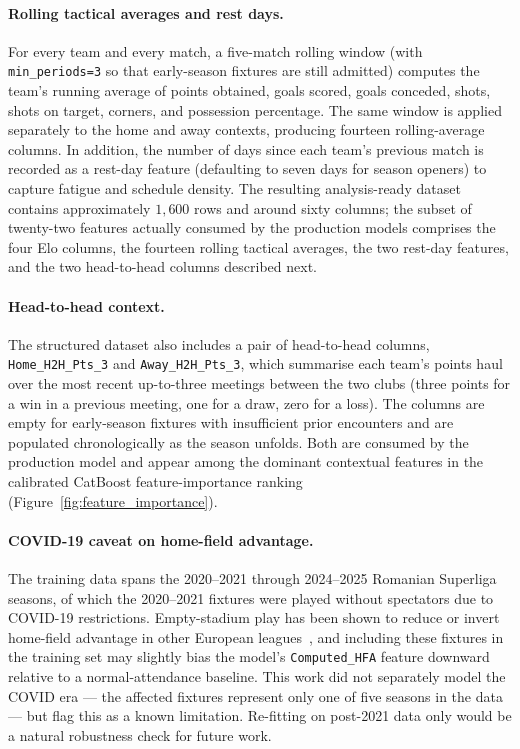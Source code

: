 \paragraph{Rolling tactical averages and rest days.}
For every team and every match, a five-match rolling window (with \texttt{min\_periods=3} so that early-season fixtures are still admitted) computes the team's running average of points obtained, goals scored, goals conceded, shots, shots on target, corners, and possession percentage. The same window is applied separately to the home and away contexts, producing fourteen rolling-average columns. In addition, the number of days since each team's previous match is recorded as a rest-day feature (defaulting to seven days for season openers) to capture fatigue and schedule density. The resulting analysis-ready dataset contains approximately $1{,}600$ rows and around sixty columns; the subset of twenty-two features actually consumed by the production models comprises the four Elo columns, the fourteen rolling tactical averages, the two rest-day features, and the two head-to-head columns described next.

\paragraph{Head-to-head context.}
The structured dataset also includes a pair of head-to-head columns, \texttt{Home\_H2H\_Pts\_3} and \texttt{Away\_H2H\_Pts\_3}, which summarise each team's points haul over the most recent up-to-three meetings between the two clubs (three points for a win in a previous meeting, one for a draw, zero for a loss). The columns are empty for early-season fixtures with insufficient prior encounters and are populated chronologically as the season unfolds. Both are consumed by the production model and appear among the dominant contextual features in the calibrated CatBoost feature-importance ranking (Figure~\ref{fig:feature_importance}).

\paragraph{COVID-19 caveat on home-field advantage.}
The training data spans the 2020--2021 through 2024--2025 Romanian Superliga seasons, of which the 2020--2021 fixtures were played without spectators due to COVID-19 restrictions. Empty-stadium play has been shown to reduce or invert home-field advantage in other European leagues~\cite{tilp2020covid}, and including these fixtures in the training set may slightly bias the model's \texttt{Computed\_HFA} feature downward relative to a normal-attendance baseline. This work did not separately model the COVID era --- the affected fixtures represent only one of five seasons in the data --- but flag this as a known limitation. Re-fitting on post-2021 data only would be a natural robustness check for future work.

